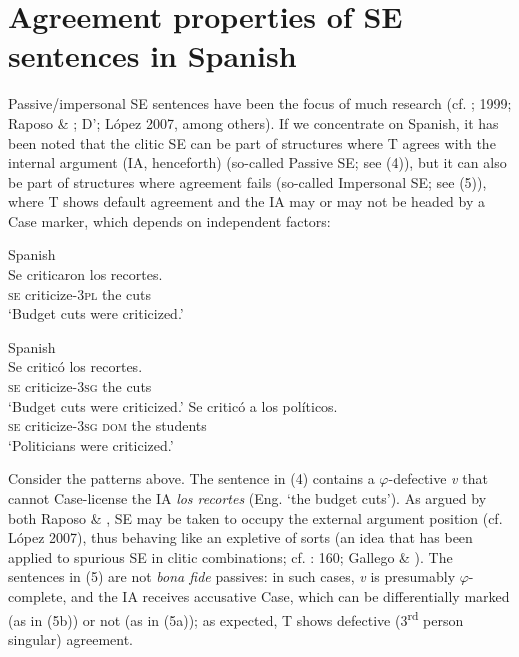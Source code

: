 \documentclass[output=paper]{langsci/langscibook}
\begin{document}
\section{Agreement properties of SE sentences in Spanish}%

Passive/impersonal SE sentences have been the focus of much research (cf. \citealt{Mendikoetxea1992}; 1999; Raposo \& \citealt{Uriagereka1996}; D’\citealt{Alessandro2007}; López 2007, among others). If we concentrate on Spanish, it has been noted that the clitic SE can be part of structures where T agrees with the internal argument (IA, henceforth) (so-called Passive SE; see (4)), but it can also be part of structures where agreement fails (so-called Impersonal SE; see (5)), where T shows default agreement and the IA may or may not be headed by a Case marker, which depends on independent factors:

\ea%
    Spanish\label{ex:gallego:4}\\
    \gll Se  criticaron        los recortes.        \\
         \textsc{se} criticize-\textsc{3pl}  the cuts\\
    \glt ‘Budget cuts were criticized.’
    \z

\ea%
    Spanish\label{ex:gallego:5}\\
    \ea
    \gll Se   criticó             los  recortes.      \\
          \textsc{se}  criticize-\textsc{3sg}  the  cuts\\
    \glt ‘Budget cuts were criticized.’
    \ex
    \gll Se  criticó             a        los  políticos.           \\
         \textsc{se}  criticize-\textsc{3sg}  \textsc{dom} the students\\
    \glt ‘Politicians were criticized.’
    \z
\z

Consider the patterns above. The sentence in (4) contains a $\varphi $-defective \textit{v} that cannot Case-license the IA \textit{los recortes} (Eng. ‘the budget cuts’). As argued by both Raposo \& \citet{Uriagereka1996}, SE may be taken to occupy the external argument position (cf. López 2007), thus behaving like an expletive of sorts (an idea that has been applied to spurious SE in clitic combinations; cf. \citealt{Kayne2000}: 160; Gallego \& \citealt{Uriagereka2017}). The sentences in (5) are not \textit{bona fide} passives: in such cases, \textit{v} is presumably $\varphi $-complete, and the IA receives accusative Case, which can be differentially marked (as in (5b)) or not (as in (5a)); as expected, T shows defective (3\textsuperscript{rd} person singular) agreement.
\end{document}
